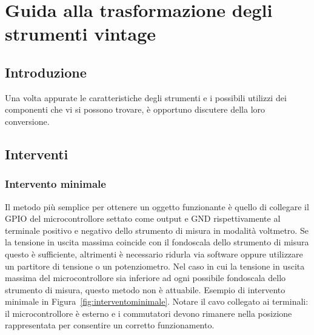 \documentclass[12pt,a4paper]{report}
\begin{document}
\chapter{Guida alla trasformazione degli strumenti vintage}




\section{Introduzione}
Una volta appurate le caratteristiche degli strumenti e i possibili utilizzi dei componenti che vi si possono trovare, è opportuno discutere
della loro conversione.


\section{Interventi}
\subsection{Intervento minimale}
Il metodo più semplice per ottenere un oggetto funzionante è quello di collegare il GPIO del microcontrollore settato come output
e GND rispettivamente al terminale positivo e negativo dello strumento di misura in modalità voltmetro. Se la tensione in uscita massima
coincide con il fondoscala dello strumento di misura questo è sufficiente, altrimenti è necessario ridurla via software oppure
utilizzare un partitore di tensione o un potenziometro. Nel caso in cui la tensione in uscita massima del microcontrollore sia inferiore
ad ogni possibile fondoscala dello strumento di misura, questo metodo non è attuabile. Esempio di intervento minimale in
Figura~\ref{fig:interventominimale}. Notare il cavo collegato ai terminali: il microcontrollore è esterno
e i commutatori devono rimanere nella posizione rappresentata per consentire un corretto funzionamento.
\end{document}
